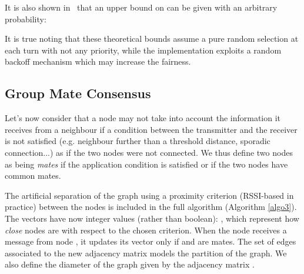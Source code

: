 \documentclass{sig-alternate}
\begin{document}
\addtocounter{equation}{-1}


It is also shown in~\cite{mobihoc} that an upper bound on  can be given with an arbitrary probability: 


It is true noting that these theoretical bounds assume a pure random selection at each turn with not any priority, while the implementation exploits a random backoff mechanism which may increase the fairness. 




\newcommand{\rbm}{\sc RBM}
\newcommand{\rgg}{\sc RGG}







 

\subsection{Group Mate Consensus}
\label{sec-extension}
\label{sec:group_det}

\newcommand{\gmc}{\sc gmc}




Let's now consider that a node may not take into account the information it receives from a neighbour if a condition between the transmitter and the receiver is not satisfied (e.g. neighbour further than a threshold distance, sporadic connection...) as if the two nodes were not connected. We thus define two nodes as being \emph{mates} if the application condition is satisfied or if the two nodes have common mates.





The artificial separation of the graph using a proximity criterion (RSSI-based in practice) between the nodes is included in the full algorithm (Algorithm \ref{algo3}).
The  vectors have now integer values (rather than boolean):  , which represent how {\em close} nodes are with respect to the chosen criterion. When the  node receives a message from node , it updates its  vector only if  and  are mates.
The set of edges  associated to the new adjacency matrix   models the partition of the graph. We also define  the diameter of the graph given by the adjacency matrix .











\addtocounter{equation}{-1}
\end{document}
